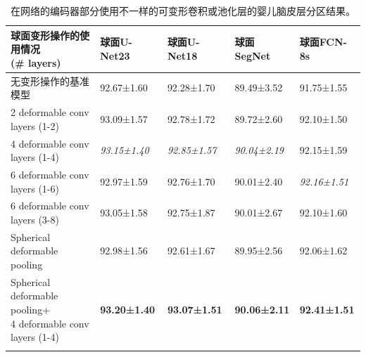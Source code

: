 \begin{table}[h]
		\caption{\label{tab:婴儿数据集分区结果}在网络的编码器部分使用不一样的可变形卷积或池化层的婴儿脑皮层分区结果。}
		\centering
		\begin{tabularx}{\linewidth}{l X<{\centering} X<{\centering} X<{\centering} X<{\centering}}
			\Xhline{2\arrayrulewidth}
			\makecell{球面变形操作的使用情况\\ (\# layers)}& 球面U-Net23      & 球面U-Net18     &  球面SegNet & 球面FCN-8s   \\
			\hline
			无变形操作的基准模型                    &  92.67±1.60            &	92.28±1.70       &  89.49±3.52       	 &		91.75±1.55 \\   
			
			2 deformable conv layers (1-2)           &	93.09±1.57           &	92.78±1.72		 &  89.72±2.60           &	92.10±1.50  \\
			4 deformable conv layers (1-4)           & 	\textit{93.15±1.40}	& \textit{92.85±1.57}	& \textit{90.04±2.19}			&92.15±1.59  \\
			6 deformable conv layers (1-6)           & 	92.97±1.59	&		92.76±1.70	&		90.01±2.40	&		\textit{92.16±1.51} \\
			6 deformable conv layers (3-8) 	         &	93.05±1.58	&		92.75±1.87	&		90.01±2.67		&	92.10±1.60 \\
			
			Spherical deformable pooling            &  	92.98±1.56	&	92.61±1.67	&		89.95±2.56	&		92.06±1.62\\
			
			\makecell{Spherical deformable pooling+\\4 deformable conv layers (1-4)} &	\textbf{93.20±1.40} &	\textbf{93.07±1.51}	& \textbf{90.06±2.11}	&  \textbf{92.41±1.51}	 \\
			\Xhline{2\arrayrulewidth} 
		\end{tabularx}
\end{table}

